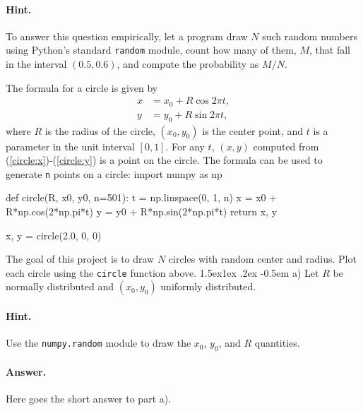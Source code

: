 \documentclass[%
oneside,                 %
final,                   %
10pt]{article}
\makeatletter
\newenvironment{doconceexercise}{}{}
\newcounter{doconceexercisecounter}
\newcommand\subex{\@startsection{paragraph}{4}{\z@}%
                  {1.5ex\@plus1ex \@minus.2ex}%
                  {-0.5em}%
                  {\normalfont\normalsize\bfseries}}
\theoremstyle{definition}
\makeatother
\begin{document}
\begin{enumerate}
\begin{doconceexercise}
\paragraph{Hint.}
To answer this question empirically, let a program
draw $N$ such random numbers using Python's standard \texttt{random} module,
count how many of them, $M$, that fall in the interval $(0.5,0.6)$, and
compute the probability as $M/N$.
\end{doconceexercise}
\begin{doconceexercise}
                             
\label{proj:circle1}
The formula for a circle is given by
\begin{align}
x &= x_0 + R\cos 2\pi t,
\label{circle:x}\\ 
y &= y_0 + R\sin 2\pi t,
\label{circle:y}
\end{align}
where $R$ is the radius of the circle, $(x_0,y_0)$ is the
center point, and $t$ is a parameter in the unit interval $[0,1]$.
For any $t$, $(x,y)$ computed from (\ref{circle:x})-(\ref{circle:y})
is a point on the circle.
The formula can be used to generate \texttt{n} points on a circle:
\bpypro
import numpy as np

def circle(R, x0, y0, n=501):
    t = np.linspace(0, 1, n)
    x = x0 + R*np.cos(2*np.pi*t)
    y = y0 + R*np.sin(2*np.pi*t)
    return x, y

x, y = circle(2.0, 0, 0)

\epypro

The goal of this project is to draw $N$ circles with random
center and radius. Plot each circle using the \texttt{circle} function
above.
\subex{a)}
Let $R$ be normally distributed and $(x_0,y_0)$ uniformly distributed.
\paragraph{Hint.}
Use the \texttt{numpy.random} module to draw the
$x_0$, $y_0$, and $R$ quantities.
\paragraph{Answer.}
Here goes the short answer to part a).

\end{doconceexercise}
\end{enumerate}
\end{document}

